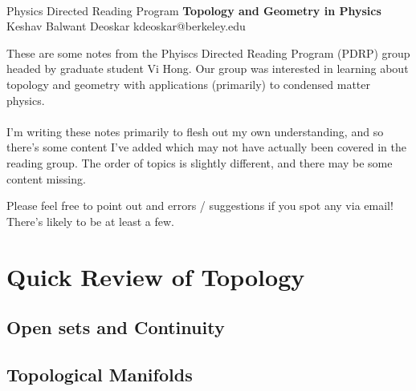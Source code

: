 \documentclass[11pt]{article}
\begin{document}
\thispagestyle{empty}
\bigskip \
\vspace{0.1cm}

\begin{center}
{\fontsize{22}{22} \selectfont Physics Directed Reading Program}
\vskip 16pt
{\fontsize{36}{36} \selectfont \bf \sffamily Topology and Geometry in Physics}
\vskip 24pt
{\fontsize{18}{18} \selectfont \rmfamily Keshav Balwant Deoskar} 
\vskip 6pt
{\fontsize{14}{14} \selectfont \ttfamily kdeoskar@berkeley.edu} 
\vskip 24pt
\end{center}



These are some notes from the Phyiscs Directed Reading Program (PDRP) group headed by graduate student Vi Hong. Our group was interested in learning about topology and geometry with applications (primarily) to condensed matter physics.   
\\
\\
I'm writing these notes primarily to flesh out my own understanding, and so there's some content I've added which may not have actually been covered in the reading group. The order of topics is slightly different, and there may be some content missing.

\vskip 0.5cm
\begin{redbox}
    Please feel free to point out and errors / suggestions if you spot any via email! There's likely to be at least a few. 
\end{redbox}

\tableofcontents 


\newpage
\section{Quick Review of Topology}
\vskip 0.5cm

\subsection{Open sets and Continuity}

\subsection{Topological Manifolds}
\end{document}
